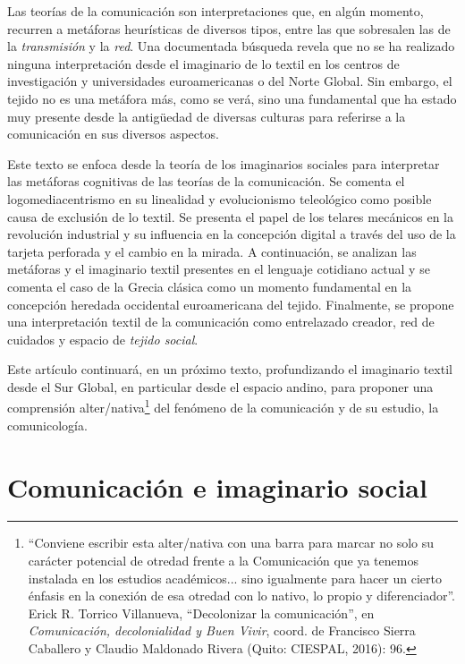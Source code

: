 \documentclass{tufte-handout}
\begin{document}
Las teorías de la comunicación son interpretaciones que, en algún
momento, recurren a metáforas heurísticas de diversos tipos, entre las
que sobresalen las de la \emph{transmisión} y la \emph{red}. Una
documentada búsqueda revela que no se ha realizado ninguna
interpretación desde el imaginario de lo textil en los centros de
investigación y universidades euroamericanas o del Norte Global. Sin
embargo, el tejido no es una metáfora más, como se verá, sino una
fundamental que ha estado muy presente desde la antigüedad de diversas
culturas para referirse a la comunicación en sus diversos aspectos.

Este texto se enfoca desde la teoría de los imaginarios sociales para
interpretar las metáforas cognitivas de las teorías de la comunicación.
Se comenta el logomediacentrismo en su linealidad y evolucionismo
teleológico como posible causa de exclusión de lo textil. Se presenta el
papel de los telares mecánicos en la revolución industrial y su
influencia en la concepción digital a través del uso de la tarjeta
perforada y el cambio en la mirada. A continuación, se analizan las
metáforas y el imaginario textil presentes en el lenguaje cotidiano
actual y se comenta el caso de la Grecia clásica como un momento
fundamental en la concepción heredada occidental euroamericana del
tejido. Finalmente, se propone una interpretación textil de la
comunicación como entrelazado creador, red de cuidados y espacio de
\emph{tejido social}.

Este artículo continuará, en un próximo texto, profundizando el
imaginario textil desde el Sur Global, en particular desde el espacio
andino, para proponer una comprensión alter/nativa\footnote{``Conviene
  escribir esta alter/nativa con una barra para marcar no solo su
  carácter potencial de otredad frente a la Comunicación que ya tenemos
  instalada en los estudios académicos... sino igualmente para hacer un
  cierto énfasis en la conexión de esa otredad con lo nativo, lo propio
  y diferenciador''. Erick R. Torrico Villanueva, ``Decolonizar la
  comunicación'', en \emph{Comunicación, decolonialidad y Buen Vivir},
  coord. de Francisco Sierra Caballero y Claudio Maldonado Rivera
  (Quito: CIESPAL, 2016): 96.} del fenómeno de la comunicación y de su
estudio, la comunicología.

\hypertarget{comunicacin-e-imaginario-social}{%
\section{Comunicación e imaginario
social}\label{comunicacin-e-imaginario-social}}
\end{document}
